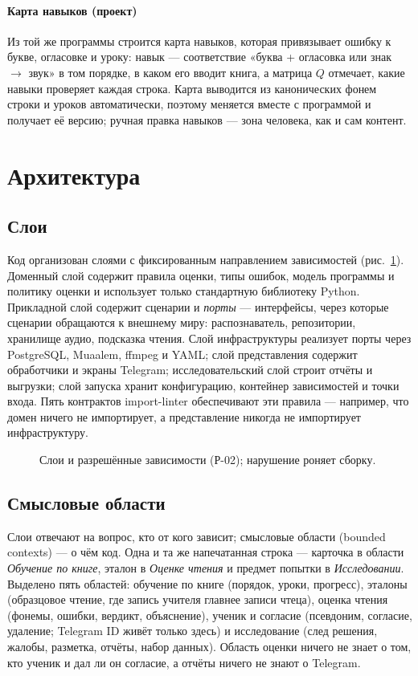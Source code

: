 \paragraph{Карта навыков (проект)} Из той же программы строится карта навыков, которая привязывает ошибку к букве, огласовке и уроку: навык --- соответствие «буква + огласовка или знак $\to$ звук» в том порядке, в каком
его вводит книга, а матрица $Q$ отмечает, какие навыки проверяет каждая строка. Карта выводится из канонических
фонем строки и уроков автоматически, поэтому меняется вместе с программой и получает её версию; ручная правка
навыков --- зона человека, как и сам контент.

\section{Архитектура}\label{sec:impl-architecture}

\subsection{Слои}

Код организован слоями с фиксированным направлением зависимостей (рис.~\ref{fig:layers}). Доменный слой
содержит правила оценки, типы ошибок, модель программы и политику оценки и использует только стандартную
библиотеку Python. Прикладной слой содержит сценарии и \emph{порты} --- интерфейсы, через которые сценарии
обращаются к внешнему миру: распознаватель, репозитории, хранилище аудио, подсказка чтения. Слой
инфраструктуры реализует порты через PostgreSQL, Muaalem, ffmpeg и YAML; слой представления содержит
обработчики и экраны Telegram; исследовательский слой строит отчёты и выгрузки; слой запуска хранит
конфигурацию, контейнер зависимостей и точки входа. Пять контрактов import-linter обеспечивают эти
правила --- например, что домен ничего не импортирует, а представление никогда не импортирует
инфраструктуру.

\begin{figure}[ht]
\centering
\resizebox{0.9\linewidth}{!}{}
\caption{Слои и разрешённые зависимости (Р-02); нарушение роняет сборку.}\label{fig:layers}
\end{figure}

\subsection{Смысловые области}

Слои отвечают на вопрос, кто от кого зависит; смысловые области (bounded contexts) --- о чём код. Одна и та
же напечатанная строка --- карточка в области \emph{Обучение по книге}, эталон в \emph{Оценке чтения} и
предмет попытки в \emph{Исследовании}. Выделено пять областей: обучение по книге (порядок, уроки,
прогресс), эталоны (образцовое чтение, где запись учителя главнее записи чтеца), оценка чтения (фонемы,
ошибки, вердикт, объяснение), ученик и согласие (псевдоним, согласие, удаление; Telegram ID живёт только
здесь) и исследование (след решения, жалобы, разметка, отчёты, набор данных). Область оценки ничего не
знает о том, кто ученик и дал ли он согласие, а отчёты ничего не знают о Telegram.

